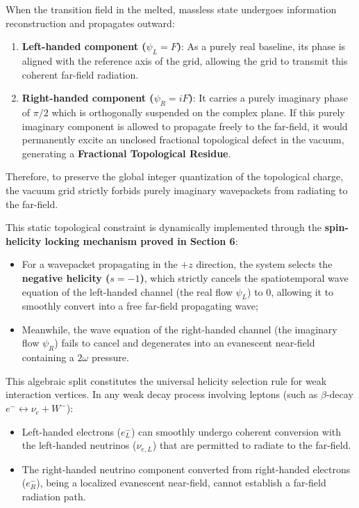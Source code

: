 \documentclass[12pt, a4paper]{article}
\begin{document}
When the transition field in the melted, massless state undergoes information reconstruction and propagates outward:
\begin{enumerate}
    \item \textbf{Left-handed component ($\psi_L = F$)}: As a purely real baseline, its phase is aligned with the reference axis of the grid, allowing the grid to transmit this coherent far-field radiation.
    
    \item \textbf{Right-handed component ($\psi_R = iF$)}: It carries a purely imaginary phase of $\pi/2$ which is orthogonally suspended on the complex plane. If this purely imaginary component is allowed to propagate freely to the far-field, it would permanently excite an unclosed fractional topological defect in the vacuum, generating a \textbf{Fractional Topological Residue}.
\end{enumerate}

Therefore, to preserve the global integer quantization of the topological charge, the vacuum grid strictly forbids purely imaginary wavepackets from radiating to the far-field.

This static topological constraint is dynamically implemented through the \textbf{spin-helicity locking mechanism proved in Section 6}:
\begin{itemize}
    \item For a wavepacket propagating in the $+z$ direction, the system selects the \textbf{negative helicity ($s = -1$)}, which strictly cancels the spatiotemporal wave equation of the left-handed channel (the real flow $\psi_L$) to $0$, allowing it to smoothly convert into a free far-field propagating wave;
    
    \item Meanwhile, the wave equation of the right-handed channel (the imaginary flow $\psi_R$) fails to cancel and degenerates into an evanescent near-field containing a $2\omega$ pressure.
\end{itemize}

This algebraic split constitutes the universal helicity selection rule for weak interaction vertices. In any weak decay process involving leptons (such as $\beta$-decay $e^- \leftrightarrow \nu_e + W^-$):
\begin{itemize}
    \item Left-handed electrons ($e^-_L$) can smoothly undergo coherent conversion with the left-handed neutrinos ($\nu_{e,L}$) that are permitted to radiate to the far-field.
    
    \item The right-handed neutrino component converted from right-handed electrons ($e^-_R$), being a localized evanescent near-field, cannot establish a far-field radiation path.
\end{itemize}
\end{document}

